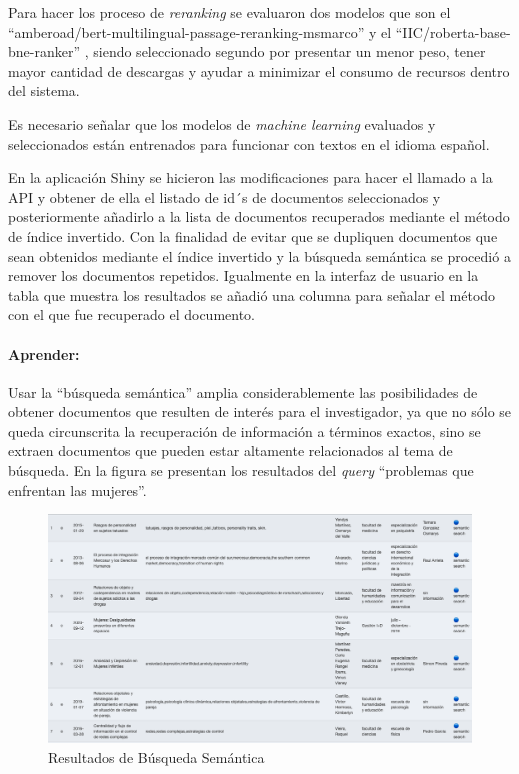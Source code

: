 \documentclass[
  12pt,
  openany]{book}
\begin{document}
Para hacer los proceso de \emph{reranking} se evaluaron dos modelos que son el ``amberoad/bert-multilingual-passage-reranking-msmarco'' \citep{erankingmsmarco} y el ``IIC/roberta-base-bne-ranker'' \citep{hfranker2023}, siendo seleccionado segundo por presentar un menor peso, tener mayor cantidad de descargas y ayudar a minimizar el consumo de recursos dentro del sistema.

Es necesario señalar que los modelos de \emph{machine learning} evaluados y seleccionados están entrenados para funcionar con textos en el idioma español.

En la aplicación Shiny se hicieron las modificaciones para hacer el llamado a la API y obtener de ella el listado de id´s de documentos seleccionados y posteriormente añadirlo a la lista de documentos recuperados mediante el método de índice invertido. Con la finalidad de evitar que se dupliquen documentos que sean obtenidos mediante el índice invertido y la búsqueda semántica se procedió a remover los documentos repetidos. Igualmente en la interfaz de usuario en la tabla que muestra los resultados se añadió una columna para señalar el método con el que fue recuperado el documento.

\hypertarget{semanapre}{%
\paragraph{Aprender:}\label{semanapre}}

Usar la ``búsqueda semántica'' amplia considerablemente las posibilidades de obtener documentos que resulten de interés para el investigador, ya que no sólo se queda circunscrita la recuperación de información a términos exactos, sino se extraen documentos que pueden estar altamente relacionados al tema de búsqueda. En la figura se presentan los resultados del \emph{query} ``problemas que enfrentan las mujeres''.

\begin{figure}

{\centering \includegraphics[width=0.9\linewidth]{images/05-desarrollo/5_ciclo/resultsemantico} 

}

\caption{Resultados de Búsqueda Semántica}\label{fig:resultsemantico}
\end{figure}
\end{document}
